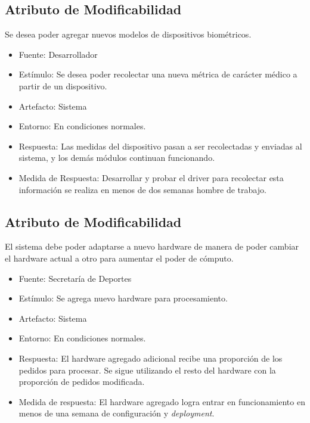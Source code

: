 \subsection{Atributo de Modificabilidad}

Se desea poder agregar nuevos modelos de dispositivos biométricos.

\begin{itemize}
\itemsep1pt\parskip0pt
\item
  Fuente: Desarrollador
\item
  Estímulo: Se desea poder recolectar una nueva métrica de carácter
  médico a partir de un dispositivo.
\item
  Artefacto: Sistema
\item
  Entorno: En condiciones normales.
\item
  Respuesta: Las medidas del dispositivo pasan a ser recolectadas y
  enviadas al sistema, y los demás módulos continuan funcionando.
\item
  Medida de Respuesta: Desarrollar y probar el driver para recolectar
  esta información se realiza en menos de dos semanas hombre de trabajo.
\end{itemize}

\subsection{Atributo de Modificabilidad}

El sistema debe poder adaptarse a nuevo hardware de manera de poder
cambiar el hardware actual a otro para aumentar el poder de cómputo.

\begin{itemize}
\itemsep1pt\parskip0pt
\item
  Fuente: Secretaría de Deportes
\item
  Estímulo: Se agrega nuevo hardware para procesamiento.
\item
  Artefacto: Sistema
\item
  Entorno: En condiciones normales.
\item
  Respuesta: El hardware agregado adicional recibe una proporción de los
  pedidos para procesar. Se sigue utilizando el resto del hardware con
  la proporción de pedidos modificada.
\item
  Medida de respuesta: El hardware agregado logra entrar en
  funcionamiento en menos de una semana de configuración y
  \emph{deployment}.
\end{itemize}

